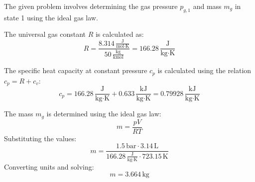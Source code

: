 The given problem involves determining the gas pressure \( p_{g,1} \) and mass \( m_g \) in state 1 using the ideal gas law.  

The universal gas constant \( R \) is calculated as:  
\[
R = \frac{8.314 \, \frac{\text{J}}{\text{mol·K}}}{50 \, \frac{\text{kg}}{\text{kmol}}} = 166.28 \, \frac{\text{J}}{\text{kg·K}}
\]  

The specific heat capacity at constant pressure \( c_p \) is calculated using the relation \( c_p = R + c_v \):  
\[
c_p = 166.28 \, \frac{\text{J}}{\text{kg·K}} + 0.633 \, \frac{\text{kJ}}{\text{kg·K}} = 0.79928 \, \frac{\text{kJ}}{\text{kg·K}}
\]  

The mass \( m_g \) is determined using the ideal gas law:  
\[
m = \frac{p V}{R T}
\]  
Substituting the values:  
\[
m = \frac{1.5 \, \text{bar} \cdot 3.14 \, \text{L}}{166.28 \, \frac{\text{J}}{\text{kg·K}} \cdot 723.15 \, \text{K}}
\]  
Converting units and solving:  
\[
m = 3.664 \, \text{kg}
\]